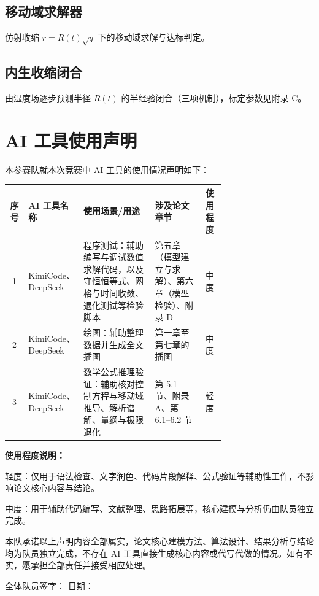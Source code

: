 \documentclass[12pt,a4paper]{ctexart}
\numberwithin{equation}{section}
\begin{document}
\subsection{移动域求解器}
仿射收缩 $r=R(t)\sqrt q$ 下的移动域求解与达标判定。


\subsection{内生收缩闭合}
由湿度场逐步预测半径 $R(t)$ 的半经验闭合（三项机制），标定参数见附录 C。


\clearpage
\section*{AI 工具使用声明}

本参赛队就本次竞赛中 AI 工具的使用情况声明如下：

\begin{table}[H]
\centering
\small
\begin{tabular}{@{}cp{0.15\linewidth}p{0.33\linewidth}p{0.22\linewidth}c@{}}
\toprule
序号 & AI 工具名称 & 使用场景/用途 & 涉及论文章节 & 使用程度 \\
\midrule
1 & KimiCode、DeepSeek & 程序测试：辅助编写与调试数值求解代码，以及守恒恒等式、网格与时间收敛、退化测试等检验脚本 & 第五章（模型建立与求解）、第六章（模型检验）、附录 D & 中度 \\
2 & KimiCode、DeepSeek & 绘图：辅助整理数据并生成全文插图 & 第一章至第七章的插图 & 中度 \\
3 & KimiCode、DeepSeek & 数学公式推理验证：辅助核对控制方程与移动域推导、解析谱解、量纲与极限退化 & 第 5.1 节、附录 A、第 6.1--6.2 节 & 轻度 \\
\bottomrule
\end{tabular}
\end{table}

\textbf{使用程度说明：}

轻度：仅用于语法检查、文字润色、代码片段解释、公式验证等辅助性工作，不影响论文核心内容与结论。

中度：用于辅助代码编写、文献整理、思路拓展等，核心建模与分析仍由队员独立完成。

本队承诺以上声明内容全部属实，论文核心建模方法、算法设计、结果分析与结论均为队员独立完成，不存在 AI 工具直接生成核心内容或代写代做的情况。如有不实，愿承担全部责任并接受相应处理。

\vspace{1em}
\noindent 全体队员签字：\underline{\hspace{4cm}} \hfill 日期：\underline{\hspace{3cm}}
\end{document}

